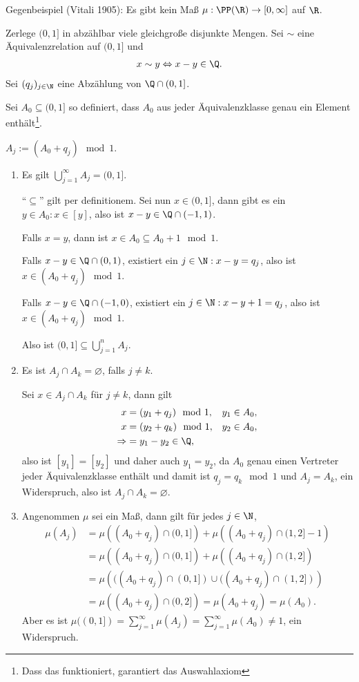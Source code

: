 \begin{bsp}
\label{bsp:3.2}
Gegenbeispiel (Vitali 1905): Es gibt kein Maß $\mu: \PP(\R)\to[0,\infty]$ auf
$\R$.

Zerlege $(0,1]$ in abzählbar viele gleichgroße disjunkte Mengen. Sei $\sim$
eine Äquivalenzrelation auf $(0,1]$ und
\begin{align*}
x\sim y\Leftrightarrow x-y\in\Q.
\end{align*}
Sei $(q_j)_{j\in\N}$ eine Abzählung von $\Q\cap(0,1]$.

Sei $A_0\subseteq(0,1]$ so definiert, dass $A_0$ aus jeder
Äquivalenzklasse genau ein Element enthält\footnote{Dass das funktioniert,
garantiert das Auswahlaxiom}.

$A_j:= (A_0+q_j)\mod 1$.
\begin{enumerate}[label=(\alph{*})]
  \item Es gilt $\bigcup_{j=1}^\infty A_j = (0,1]$.
  
  ``$\subseteq$'' gilt per
  definitionem. Sei nun $x\in(0,1]$, dann gibt es ein $y\in A_0: x\in[y]$, also
  ist $x-y\in\Q\cap(-1,1)$.
  
  Falls $x=y$, dann ist $x\in A_0\subseteq A_0 + 1\mod 1$.
  
  Falls $x-y\in\Q\cap (0,1)$, existiert ein $j\in\N : x-y=q_j$, also ist $x\in
  (A_0 + q_j)\mod 1$.
  
  Falls $x-y\in\Q\cap(-1,0)$, existiert ein $j\in\N : x-y + 1 = q_j$, also ist
  $x\in (A_0+q_j)\mod 1$.
  
  Also ist $(0,1]\subseteq \bigcup_{j=1}^n A_j$.
  \item Es ist $A_j\cap A_k = \varnothing$, falls $j\neq k$.
  
Sei $x\in A_j\cap A_k$ für $j\neq k$, dann gilt
\begin{align*}
x &= (y_1+q_j)\mod 1, && y_1\in A_0,\\
x &= (y_2+q_k)\mod 1, && y_2\in A_0,\\
\Rightarrow &= y_1-y_2\in\Q,
\end{align*}  
also ist $[y_1]=[y_2]$ und daher auch $y_1=y_2$, da $A_0$ genau einen Vertreter
jeder Äquivalenzklasse enthält und damit ist $q_j=q_k\mod 1$ und $A_j=A_k$, ein
Widerspruch, also ist $A_j\cap A_k = \varnothing$.
\item Angenommen $\mu$ sei ein Maß, dann gilt für jedes $j\in\N$,
\begin{align*}
\mu(A_j) &= \mu\left((A_0 + q_j)\cap (0,1]\right) + \mu\left((A_0+q_j)\cap (1,2]
-1 \right) \\
&= \mu\left((A_0 + q_j)\cap (0,1]\right) + \mu\left((A_0+q_j)\cap (1,2]
\right) \\
&= \mu\left(((A_0 + q_j)\cap (0,1]) \cup ((A_0+q_j)\cap (1,2])
\right) \\
&= \mu\left((A_0+q_j)\cap (0,2]\right) = \mu(A_0 + q_j) = \mu(A_0).
\end{align*}
Aber es ist $\mu((0,1]) = \sum\limits_{j=1}^\infty \mu(A_j) =
\sum\limits_{j=1}^\infty \mu(A_0)\neq 1$, ein Widerspruch.\bsphere
\end{enumerate}
\end{bsp}


